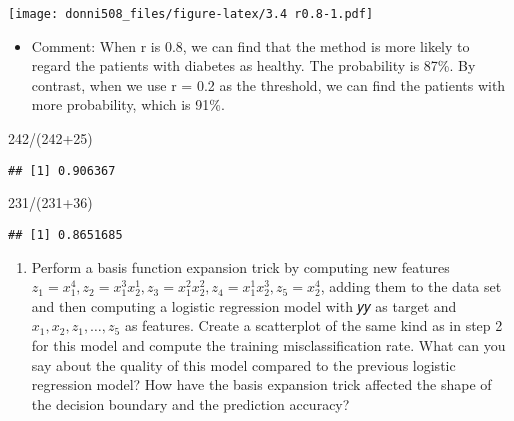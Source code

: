 \documentclass[
]{article}
\newenvironment{Shaded}{\begin{snugshade}}{\end{snugshade}}
\newcommand{\DecValTok}[1]{\textcolor[rgb]{0.00,0.00,0.81}{#1}}
\newcommand{\NormalTok}[1]{#1}
\newcommand{\SpecialCharTok}[1]{\textcolor[rgb]{0.00,0.00,0.00}{#1}}
\providecommand{\tightlist}{%
  \setlength{\itemsep}{0pt}\setlength{\parskip}{0pt}}
\begin{document}
\texttt{[image: donni508\_files/figure-latex/3.4 r0.8-1.pdf]}

\begin{itemize}
\tightlist
\item
  Comment: When r is 0.8, we can find that the method is more likely to
  regard the patients with diabetes as healthy. The probability is 87\%.
  By contrast, when we use r = 0.2 as the threshold, we can find the
  patients with more probability, which is 91\%.
\end{itemize}

\begin{Shaded}
\begin{Highlighting}[]
\DecValTok{242}\SpecialCharTok{/}\NormalTok{(}\DecValTok{242}\SpecialCharTok{+}\DecValTok{25}\NormalTok{)}
\end{Highlighting}
\end{Shaded}

\begin{verbatim}
## [1] 0.906367
\end{verbatim}

\begin{Shaded}
\begin{Highlighting}[]
\DecValTok{231}\SpecialCharTok{/}\NormalTok{(}\DecValTok{231}\SpecialCharTok{+}\DecValTok{36}\NormalTok{)}
\end{Highlighting}
\end{Shaded}

\begin{verbatim}
## [1] 0.8651685
\end{verbatim}

\begin{enumerate}
\def\labelenumi{\arabic{enumi}.}
\setcounter{enumi}{4}
\tightlist
\item
  Perform a basis function expansion trick by computing new features
  \(z_1 = x_1^4, z_2 = x_1^3x_2^1, z_3 = x_1^2x_2^2, z_4 = x_1^1x_2^3, z_5 = x_2^4\),
  adding them to the data set and then computing a logistic regression
  model with 𝑦𝑦 as target and \(x_1, x_2, z_1, …,z_5\) as features.
  Create a scatterplot of the same kind as in step 2 for this model and
  compute the training misclassification rate. What can you say about
  the quality of this model compared to the previous logistic regression
  model? How have the basis expansion trick affected the shape of the
  decision boundary and the prediction accuracy?
\end{enumerate}
\end{document}
